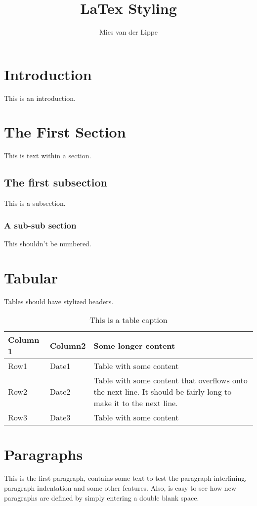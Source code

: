 \documentclass{report}
\author{Mies van der Lippe}
\title{LaTex Styling}
\begin{document}
	
	\tableofcontents
	\newpage
	\section{Introduction}
	This is an introduction. 
	
	\newpage
	
	\section{The First Section}
	This is text within a section. 
	
	\subsection{The first subsection}
	This is a subsection.
	
	\subsubsection{A sub-sub section}
	This shouldn't be numbered. 
	
	\section{Tabular}
	Tables should have stylized headers. 
	
	\begin{table}[!h]
		\begin{tabular}{|p{2cm}|p{2.5cm}|p{11cm}|} \hline
			Column 1	& Column2	& Some longer content\\\hline
			Row1	& Date1	& Table with some content\\\hline	
			Row2	& Date2	& Table with some content that overflows onto the next line. It should be fairly long to make it to the next line.\\\hline	
			Row3	& Date3	& Table with some content\\\hline	
		\end{tabular}
		\caption{This is a table caption}
	\end{table} 

	\section{Paragraphs}
	This is the first paragraph, contains some text to test the paragraph
	interlining, paragraph indentation and some other features. Also, is 
	easy to see how new paragraphs are defined by simply entering a double 
	blank space.
	
\end{document}
